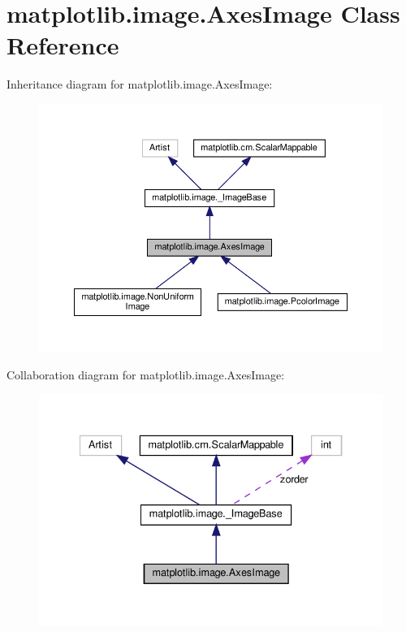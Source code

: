 \hypertarget{classmatplotlib_1_1image_1_1AxesImage}{}\section{matplotlib.\+image.\+Axes\+Image Class Reference}
\label{classmatplotlib_1_1image_1_1AxesImage}


Inheritance diagram for matplotlib.\+image.\+Axes\+Image\+:
\nopagebreak
\begin{figure}[H]
\begin{center}
\leavevmode
\includegraphics[width=350pt]{classmatplotlib_1_1image_1_1AxesImage__inherit__graph}
\end{center}
\end{figure}


Collaboration diagram for matplotlib.\+image.\+Axes\+Image\+:
\nopagebreak
\begin{figure}[H]
\begin{center}
\leavevmode
\includegraphics[width=334pt]{classmatplotlib_1_1image_1_1AxesImage__coll__graph}
\end{center}
\end{figure}
